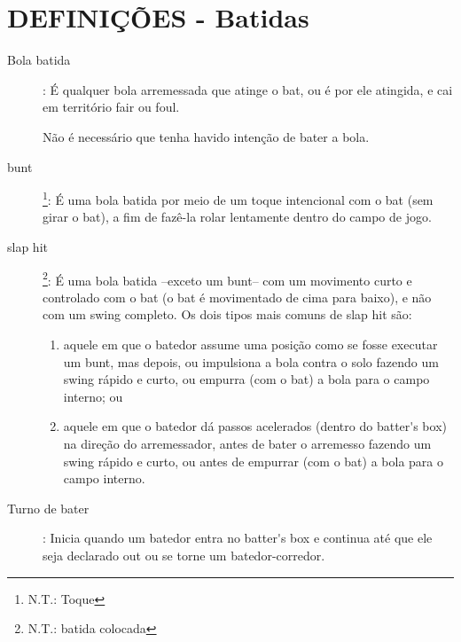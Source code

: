 	\section{DEFINI\c{C}\~OES - Batidas}
	\begin{description}

	\item[Bola batida]: \'E qualquer bola arremessada que atinge o \gls{bat}, ou \'e por ele atingida, e cai em territ\'orio \gls{fair} ou \gls{foul}.
	
	N\~ao \'e necess\'ario que tenha havido inten\c{c}\~ao de bater a bola. 
	
	\item[\Gls{bunt}]\footnote{N.T.: Toque}: \'E uma bola batida por meio de um toque intencional com o \gls{bat} (sem girar o \gls{bat}), a fim de faz\^e-la rolar lentamente dentro do campo de jogo. 
	
		\item[\gls{slap hit}]\footnote{N.T.: batida colocada}: 	\'E uma bola batida –exceto um \gls{bunt}– com um movimento curto e controlado com o \gls{bat} (o \gls{bat} \'e movimentado de cima para baixo), e n\~ao com um \gls{swing} completo. Os dois tipos mais comuns de \gls{slap hit} s\~ao: 
	
	\begin{enumerate}[label=\alph*)]
		\item aquele em que o batedor assume uma posi\c{c}\~ao como se fosse executar um \gls{bunt}, 	mas depois, ou impulsiona a bola contra o solo fazendo um \gls{swing} r\'apido e curto, ou 	empurra (com o \gls{bat}) a bola para o campo interno; ou
		\item aquele em que o batedor d\'a passos acelerados (dentro do \gls{batter's box}) na dire\c{c}\~ao 	do arremessador, antes de bater o arremesso fazendo um \gls{swing} r\'apido e curto, ou 	antes de empurrar (com o \gls{bat}) a bola para o campo interno. 
	\end{enumerate}
	
	\item[Turno de bater]: Inicia quando um batedor entra no \gls{batter's box} e continua at\'e que ele seja declarado \gls{out} ou se torne um batedor-corredor. 
	
	\end{description}

